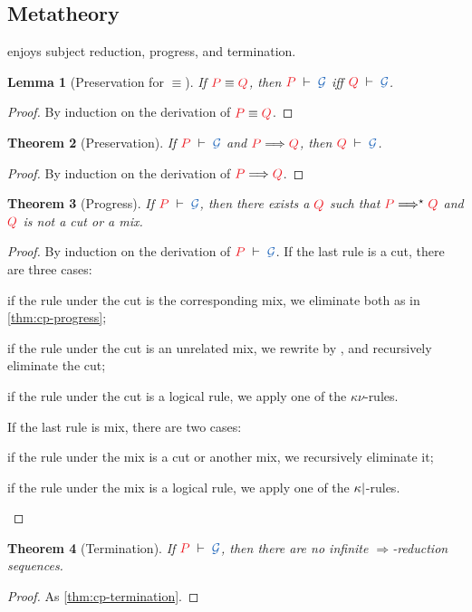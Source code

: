 \documentclass[submission,copyright,creativecommons]{eptcs}
\newtheorem{lemma}{Lemma}
\newtheorem{theorem}[lemma]{Theorem}
\begin{document}
\subsection{Metatheory}
\hcp enjoys subject reduction, progress, and termination.
\begin{lemma}[Preservation for $\equiv$]\label{lem:hcp-preservation-equiv}
  If $\tm{P}\equiv\tm{Q}$, then $\seq[P]{\mathcal{G}}$ iff $\seq[Q]{\mathcal{G}}$.
\end{lemma}\vspace*{-0.75\baselineskip}%
\begin{proof}
  By induction on the derivation of $\tm{P}\equiv\tm{Q}$.
\end{proof}%
\begin{theorem}[Preservation]\label{thm:hcp-preservation}
  If $\seq[P]{\mathcal{G}}$ and $\reducesto{P}{Q}$, then $\seq[Q]{\mathcal{G}}$.
\end{theorem}\vspace*{-0.75\baselineskip}%
\begin{proof}
  By induction on the derivation of $\reducesto{P}{Q}$.
\end{proof}%
\begin{theorem}[Progress]\label{thm:hcp-progress}
  If $\seq[P]{\mathcal{G}}$, then there exists a $\tm{Q}$ such that
  $\tm{P}\Longrightarrow^\star\tm{Q}$ and $\tm{Q}$ is not a cut or a mix.
\end{theorem}\vspace*{-0.75\baselineskip}%
\begin{proof}
  By induction on the derivation of $\seq[P]{\mathcal{G}}$. If the last rule is a cut, there are three cases:
  \begin{enumerate*}[label={\alph*)}]
  \item
    if the rule under the cut is the corresponding mix, we eliminate both as in
    \cref{thm:cp-progress};
  \item
    if the rule under the cut is an unrelated mix, we rewrite by \hccpEquivScopeExt{}, and recursively eliminate the cut;
  \item
    if the rule under the cut is a logical rule, we apply one of the $\kappa\nu$-rules.
  \end{enumerate*}
  If the last rule is mix, there are two cases:
  \begin{enumerate*}[label={\alph*)}]
  \item
    if the rule under the mix is a cut or another mix, we recursively eliminate it;
  \item
    if the rule under the mix is a logical rule, we apply one of the
    $\kappa{\ensuremath{\mid}}$-rules.
  \end{enumerate*}
\end{proof}%
\begin{theorem}[Termination]\label{thm:hcp-termination}
  If $\seq[P]{\mathcal{G}}$, then there are no infinite $\Longrightarrow$-reduction sequences.
\end{theorem}\vspace*{-0.75\baselineskip}%
\begin{proof}
  As \cref{thm:cp-termination}.
\end{proof}
\end{document}
